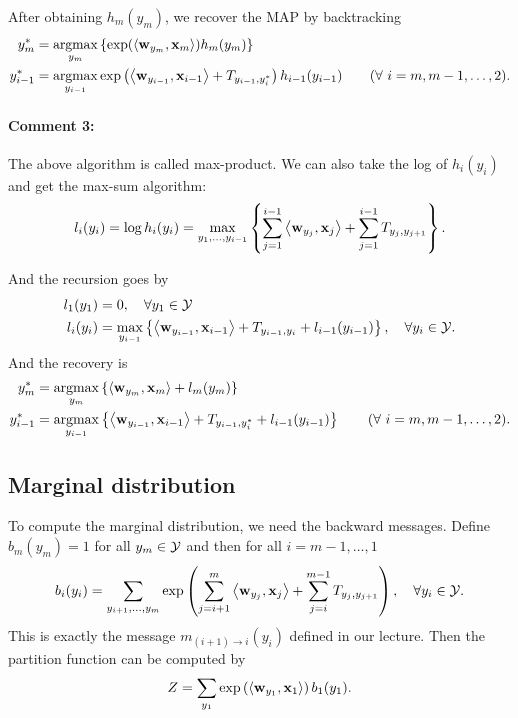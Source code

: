 \documentclass[11pt]{report}
\begin{document}
After obtaining $h_m(y_m)$, we recover the MAP by backtracking
\begin{align}
	y^*_m &= \operatorname*{\mathrm{argmax}}_{y_m} \left\{ \exp(\left\langle \mathbf{\boldsymbol{w}}_{y_m},\mathbf{\boldsymbol{x}}_m \right\rangle) h_m(y_m)\right\} \\
	y^*_{i-1} &= \operatorname*{\mathrm{argmax}}_{y_{i-1}} \exp \left(\left\langle \mathbf{\boldsymbol{w}}_{y_{i-1}},\mathbf{\boldsymbol{x}}_{i-1} \right\rangle + T_{y_{i-1}, y^*_i}\right)  h_{i-1}(y_{i-1})  \qquad (\forall\ i = m, m-1, \ldots, 2).
\end{align}

\paragraph{Comment 3:}
The above algorithm is called max-product.
We can also take the log of $h_i(y_i)$ and get the max-sum algorithm:
\begin{align}
	l_i(y_i) = \log h_i(y_i) = \max_{y_1, \ldots, y_{i-1}} \left\{\sum_{j=1}^{i-1} \left\langle \mathbf{\boldsymbol{w}}_{y_j},\mathbf{\boldsymbol{x}}_j \right\rangle + \sum_{j=1}^{i-1} T_{y_j, y_{j+1}}\right\}.
\end{align}

And the recursion goes by
\begin{align}
	l_1(y_1) &= 0, \quad \forall y_1 \in \mathcal{Y} \\
	l_i(y_i) &= \max_{y_{i-1}} \left\{\left\langle \mathbf{\boldsymbol{w}}_{y_{i-1}},\mathbf{\boldsymbol{x}}_{i-1} \right\rangle + T_{y_{i-1}, y_i} + l_{i-1}(y_{i-1})\right\}, \quad \forall y_i \in \mathcal{Y}.
\end{align}
And the recovery is
\begin{align}
	y^*_m &= \operatorname*{\mathrm{argmax}}_{y_m} \left\{ \left\langle \mathbf{\boldsymbol{w}}_{y_m},\mathbf{\boldsymbol{x}}_m \right\rangle + l_m(y_m)\right\} \\
	y^*_{i-1} &= \operatorname*{\mathrm{argmax}}_{y_{i-1}} \left\{ \left\langle \mathbf{\boldsymbol{w}}_{y_{i-1}},\mathbf{\boldsymbol{x}}_{i-1} \right\rangle + T_{y_{i-1}, y^*_i} + l_{i-1}(y_{i-1})\right\}  \qquad (\forall\ i = m, m-1, \ldots, 2).
\end{align}

\subsection{Marginal distribution}
\label{sec:marginal}

To compute the marginal distribution, we need the backward messages.
Define $b_m(y_m) = 1$ for all $y_m \in \mathcal{Y}$ and then for all $i = m-1, \ldots, 1$
\begin{align}
	b_i(y_i) = \sum_{y_{i+1}, \ldots, y_{m}} \exp \left(\sum_{j=i+1}^m \left\langle \mathbf{\boldsymbol{w}}_{y_j},\mathbf{\boldsymbol{x}}_j \right\rangle + \sum_{j=i}^{m-1} T_{y_j, y_{j+1}}\right), \quad \forall y_i \in \mathcal{Y}.
\end{align}
This is exactly the message $m_{(i+1) \to i} (y_i)$ defined in our lecture.
Then the partition function can be computed by
\begin{align}
	Z = \sum_{y_1} \exp \left(\left\langle \mathbf{\boldsymbol{w}}_{y_1},\mathbf{\boldsymbol{x}}_1 \right\rangle\right) b_1(y_1).
\end{align}
\end{document}
